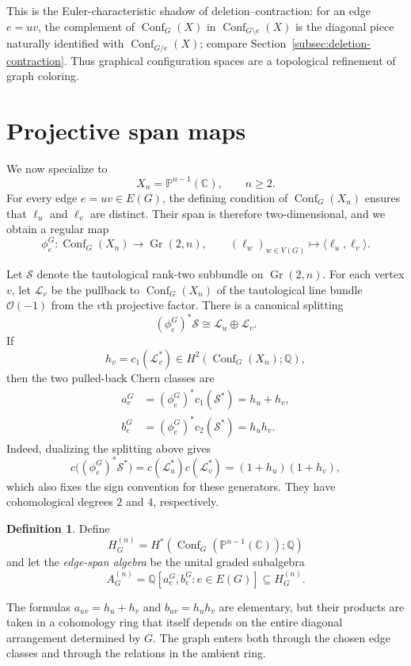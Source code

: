 \documentclass[11pt]{amsart}
\theoremstyle{plain}
\theoremstyle{definition}
\newtheorem{definition}[theorem]{Definition}
\theoremstyle{remark}
\newcommand{\Q}{\mathbb{Q}}
\newcommand{\C}{\mathbb{C}}
\newcommand{\PP}{\mathbb{P}}
\newcommand{\Conf}{\operatorname{Conf}}
\newcommand{\Gr}{\operatorname{Gr}}
\begin{document}
This is the Euler-characteristic shadow of deletion--contraction: for an edge
$e=uv$, the complement of $\Conf_G(X)$ in $\Conf_{G\setminus e}(X)$ is the
diagonal piece naturally identified with $\Conf_{G/e}(X)$; compare
Section~\ref{subsec:deletion-contraction}.  Thus graphical configuration
spaces are a topological refinement of graph coloring.

\section{Projective span maps}

We now specialize to
\[
  X_n=\PP^{n-1}(\C),\qquad n\geq 2.
\]
For every edge $e=uv\in E(G)$, the defining condition of $\Conf_G(X_n)$
ensures that $\ell_u$ and $\ell_v$ are distinct.  Their span is therefore
two-dimensional, and we obtain a regular map
\[
  \phi_e^G:\Conf_G(X_n)\longrightarrow\Gr(2,n),
  \qquad
  (\ell_w)_{w\in V(G)}\longmapsto\langle\ell_u,\ell_v\rangle.
\]

Let $\mathcal S$ denote the tautological rank-two subbundle on $\Gr(2,n)$.
For each vertex $v$, let $\mathcal L_v$ be the pullback to
$\Conf_G(X_n)$ of the tautological line bundle $\mathcal O(-1)$ from the
$v$th projective factor.  There is a canonical splitting
\[
  (\phi_e^G)^*\mathcal S\cong\mathcal L_u\oplus\mathcal L_v.
\]
If
\[
  h_v=c_1(\mathcal L_v^*)\in H^2(\Conf_G(X_n);\Q),
\]
then the two pulled-back Chern classes are
\begin{align*}
  a_e^G
  &=(\phi_e^G)^*c_1(\mathcal S^*)=h_u+h_v,\\
  b_e^G
  &=(\phi_e^G)^*c_2(\mathcal S^*)=h_uh_v.
\end{align*}
Indeed, dualizing the splitting above gives
\[
  c\bigl((\phi_e^G)^*\mathcal S^*\bigr)
  =c(\mathcal L_u^*)c(\mathcal L_v^*)
  =(1+h_u)(1+h_v),
\]
which also fixes the sign convention for these generators.
They have cohomological degrees $2$ and $4$, respectively.

\begin{definition}\label{def:edge-algebra}
Define
\[
  H_G^{(n)}
  =H^*(\Conf_G(\PP^{n-1}(\C));\Q)
\]
and let the \emph{edge-span algebra} be the unital graded subalgebra
\[
  A_G^{(n)}
  =\Q[a_e^G,b_e^G:e\in E(G)]
  \subseteq H_G^{(n)}.
\]
\end{definition}

The formulas $a_{uv}=h_u+h_v$ and $b_{uv}=h_uh_v$ are elementary, but their
products are taken in a cohomology ring that itself depends on the entire
diagonal arrangement determined by $G$.  The graph enters both through the
chosen edge classes and through the relations in the ambient ring.
\end{document}
